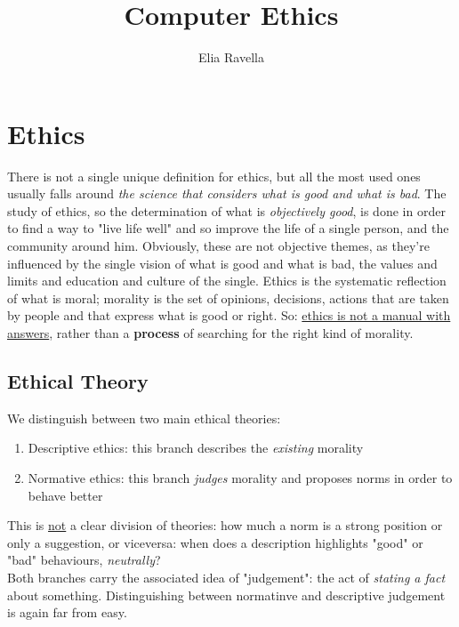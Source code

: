 \documentclass{article}
\title{Computer Ethics}
\author{Elia Ravella}
\begin{document}
	\begin{titlepage}
		\maketitle
	\end{titlepage}
	
	\tableofcontents
	\clearpage
	
	\section{Ethics}
		There is not a single unique definition for ethics, but all the most used ones usually falls around \textit{the science that considers what is good and what is bad}. The study of ethics, so the determination of what is \textit{objectively good}, is done in order to find a way to "live life well" and so improve the life of a single person, and the community around him. Obviously, these are not objective themes, as they're influenced by the single vision of what is good and what is bad, the values and limits and education and culture of the single. Ethics is the systematic reflection of what is moral; morality is the set of opinions, decisions, actions that are taken by people and that express what is good or right. So: \underline{ethics is not a manual with answers}, rather than a \textbf{process} of searching for the right kind of morality.

		\subsection{Ethical Theory}
			We distinguish between two main ethical theories:
			\begin{enumerate}
				\item Descriptive ethics: this branch describes the \textit{existing} morality
				\item Normative ethics: this branch \textit{judges} morality and proposes norms in order to behave better
			\end{enumerate}
			This is \underline{not} a clear division of theories: how much a norm is a strong position or only a suggestion, or viceversa: when does a description highlights "good" or "bad" behaviours, \textit{neutrally}?\\
			Both branches carry the associated idea of "judgement": the act of \textit{stating a fact} about something. Distinguishing between normatinve and descriptive judgement is again far from easy.
\end{document}
